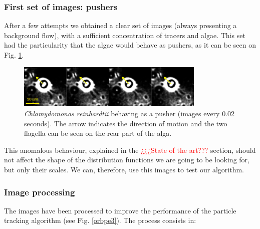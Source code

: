 \subsubsection{First set of images: pushers}

After a few attempts we obtained a clear set of images (always presenting a background flow), with a sufficient concentration of tracers and algae. This set had the particularity that the algae would behave as pushers, as it can be seen on Fig. \ref{chlamy_pusher}. 

\begin{figure}[H]
	\centering
	\includegraphics[width=0.8\textwidth]{archivos/chlamy_pusher.png}
	\caption{\textit{Chlamydomonas reinhardtii} behaving as a pusher (images every 0.02 seconds). The arrow indicates the direction of motion and the two flagella can be seen on the rear part of the alga.}
	\label{chlamy_pusher}
\end{figure}

This anomalous behaviour, explained in the \textcolor{red}{¿¿¿State of the art???} section, should not affect the shape of the distribution functions we are going to be looking for, but only their scales. We can, therefore, use this images to test our algorithm.

\subsubsection{Image processing}

The images have been processed to improve the performance of the particle tracking algorithm (see Fig. \ref{orbpe3}). The process consists in:

